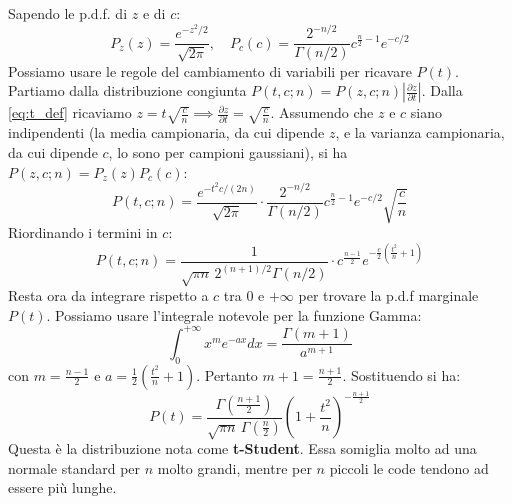 \documentclass[openany,a4paper,12pt]{book}
\theoremstyle{remark}
\begin{document}
Sapendo le p.d.f. di $z$ e di $c$:
$$ P_z(z) = \frac{e^{-z^2/2}}{\sqrt{2\pi}}, \quad P_c(c) = \frac{2^{-n/2}}{\Gamma(n/2)} c^{\frac{n}{2}-1} e^{-c/2} $$
Possiamo usare le regole del cambiamento di variabili per ricavare $P(t)$. Partiamo dalla distribuzione congiunta $P(t,c; n) = P(z,c;n) \left| \frac{\partial z}{\partial t} \right|$. Dalla \eqref{eq:t_def} ricaviamo $z = t\sqrt{\frac{c}{n}} \implies \frac{\partial z}{\partial t} = \sqrt{\frac{c}{n}}$.
Assumendo che $z$ e $c$ siano indipendenti (la media campionaria, da cui dipende $z$, e la varianza campionaria, da cui dipende $c$, lo sono per campioni gaussiani), si ha $P(z,c;n) = P_z(z)P_c(c)$:
$$ P(t,c;n) = \frac{e^{-t^2 c / (2n)}}{\sqrt{2\pi}} \cdot \frac{2^{-n/2}}{\Gamma(n/2)} c^{\frac{n}{2}-1} e^{-c/2} \sqrt{\frac{c}{n}} $$
Riordinando i termini in $c$:
$$ P(t,c;n) = \frac{1}{\sqrt{\pi n} \, 2^{(n+1)/2} \Gamma(n/2)} \cdot c^{\frac{n-1}{2}} e^{-\frac{c}{2} \left( \frac{t^2}{n} + 1 \right)} $$
Resta ora da integrare rispetto a $c$ tra $0$ e $+\infty$ per trovare la p.d.f marginale $P(t)$. Possiamo usare l'integrale notevole per la funzione Gamma:
$$ \int_0^{+\infty} x^m e^{-ax} dx = \frac{\Gamma(m+1)}{a^{m+1}} $$
con $m = \frac{n-1}{2}$ e $a = \frac{1}{2} \left( \frac{t^2}{n} + 1 \right)$. Pertanto $m+1 = \frac{n+1}{2}$.
Sostituendo si ha:
\begin{equation}
    P(t) = \frac{\Gamma\left(\frac{n+1}{2}\right)}{\sqrt{\pi n} \, \Gamma\left(\frac{n}{2}\right)} \left( 1 + \frac{t^2}{n} \right)^{-\frac{n+1}{2}}
\end{equation}
Questa è la distribuzione nota come \textbf{t-Student}. Essa somiglia molto ad una normale standard per $n$ molto grandi, mentre per $n$ piccoli le code tendono ad essere più lunghe.

\begin{center}
\end{center}
\end{document}

